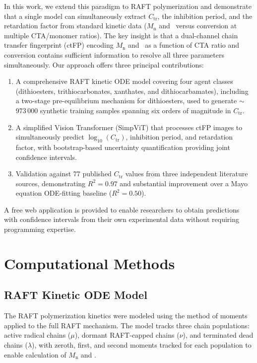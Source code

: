 \documentclass[journal=mamobx,manuscript=article]{achemso}
\begin{document}
In this work, we extend this paradigm to RAFT polymerization and demonstrate that a single model can simultaneously extract $C_\mathrm{tr}$, the inhibition period, and the retardation factor from standard kinetic data ($M_\mathrm{n}$ and \DJ\ versus conversion at multiple CTA/monomer ratios). The key insight is that a dual-channel chain transfer fingerprint (ctFP) encoding $M_\mathrm{n}$ and \DJ\ as a function of CTA ratio and conversion contains sufficient information to resolve all three parameters simultaneously. Our approach offers three principal contributions:

\begin{enumerate}
    \item A comprehensive RAFT kinetic ODE model covering four agent classes (dithioesters, trithiocarbonates, xanthates, and dithiocarbamates), including a two-stage pre-equilibrium mechanism for dithioesters, used to generate $\sim$973\,000 synthetic training samples spanning six orders of magnitude in $C_\mathrm{tr}$.
    \item A simplified Vision Transformer (SimpViT) that processes ctFP images to simultaneously predict $\log_{10}(C_\mathrm{tr})$, inhibition period, and retardation factor, with bootstrap-based uncertainty quantification providing joint confidence intervals.
    \item Validation against 77 published $C_\mathrm{tr}$ values from three independent literature sources, demonstrating $R^2 = 0.97$ and substantial improvement over a Mayo equation ODE-fitting baseline ($R^2 = 0.50$).
\end{enumerate}

A free web application is provided to enable researchers to obtain predictions with confidence intervals from their own experimental data without requiring programming expertise.

\section{Computational Methods}

\subsection{RAFT Kinetic ODE Model}

The RAFT polymerization kinetics were modeled using the method of moments applied to the full RAFT mechanism.\cite{Moad2022} The model tracks three chain populations: active radical chains ($\mu$), dormant RAFT-capped chains ($\nu$), and terminated dead chains ($\lambda$), with zeroth, first, and second moments tracked for each population to enable calculation of $M_\mathrm{n}$ and \DJ.
\end{document}

